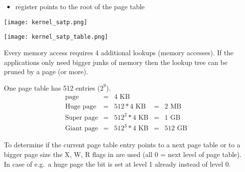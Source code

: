 \renewcommand{\arraystretch}{1}
\setlength\tabcolsep{\oldtabcolsep}

\newpar{}
\begin{itemize}
    \item {} register points to the root of the page table
\end{itemize}
\begin{center}
    \texttt{[image: kernel\_satp.png]}
\end{center}
\begin{center}
    \texttt{[image: kernel\_satp\_table.png]}
\end{center}

\newpar{}

Every memory access requires 4 additional lookups (memory accesses). If the applications only need bigger junks of memory then the lookup tree can be pruned by a page (or more).

\newpar{}
One page table has 512 entries ($2^9$).
\begin{align*}
    \text{page}       & = & 4\text{~KB}         &   &               \\
    \text{Huge page}  & = & 512 * 4\text{~KB}   & = & 2\text{~MB}   \\
    \text{Super page} & = & 512^2 * 4\text{~KB} & = & 1\text{~GB}   \\
    \text{Giant page} & = & 512^3 * 4\text{~KB} & = & 512\text{~GB}
\end{align*}

To determine if the current page table entry points to a next page table or to a bigger page size the X, W, R flags in are used (all 0 = next level of page table). In case of e.g.\ a huge page the  bit is set at level 1 already instead of level 0.

